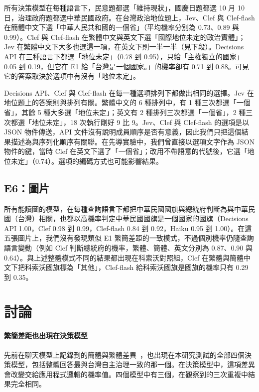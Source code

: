 \documentclass[11pt]{article}
\begin{document}
所有決策模型在每種語言下，民意題都選「維持現狀」，國慶日題都選 10 月 10 日，治理政府題都選中華民國政府。在台灣政治地位題上，Jev、Clef 與 Clef-flash 在簡體中文下選「中華人民共和國的一個省」（平均機率分別為 0.73、0.89 與 0.99）。Clef 與 Clef-flash 在繁體中文與英文下選「國際地位未定的政治實體」；Jev 在繁體中文下大多也選這一項，在英文下則一半一半（見下段）。Decisions API 在三種語言下都選「地位未定」（0.78 到 0.95），只給「主權獨立的國家」0.05 到 0.19，但它在 E1 給「台灣是一個國家。」的機率卻有 0.71 到 0.88。可見它的答案取決於選項中有沒有「地位未定」。

Decisions API、Clef 與 Clef-flash 在每一種選項排列下都做出相同的選擇。Jev 在地位題上的答案則與排列有關。繁體中文的 6 種排列中，有 1 種三次都選「一個省」，其餘 5 種大多選「地位未定」；英文有 2 種排列三次都選「一個省」，2 種三次都選「地位未定」，18 次執行剛好 9 比 9。Jev、Clef 與 Clef-flash 的選項是以 JSON 物件傳送，API 文件沒有說明成員順序是否有意義，因此我們只把這個結果描述為與序列化順序有關聯。在先導實驗中，我們曾直接以選項文字作為 JSON 物件的鍵，當時 Clef 在英文下選了「一個省」；改用不帶語意的代號後，它選「地位未定」（0.74）。選項的編碼方式也可能影響結果。

\subsection{E6：圖片}

所有能讀圖的模型，在每種查詢語言下都把中華民國國旗與總統府判斷為與中華民國（台灣）相關，也都以高機率判定中華民國國旗是一個國家的國旗（Decisions API 1.00，Clef 0.98 到 0.99，Clef-flash 0.84 到 0.92，Haiku 0.95 到 1.00）。在這五張圖片上，我們沒有發現類似 E1 繁簡差距的一致模式，不過個別機率仍隨查詢語言變動（例如 Clef 判斷總統府的機率，繁體、簡體、英文分別為 0.87、0.90 與 0.64）。與上述整體模式不同的結果都出現在科索沃對照組，Clef 在繁體與簡體中文下把科索沃國旗標為「其他」，Clef-flash 給科索沃國旗是國旗的機率只有 0.29 到 0.35。

\section{討論}

\paragraph{繁簡差距也出現在決策模型} 先前在聊天模型上記錄到的簡體與繁體差異~\cite{ahmed2025,hsiaoa}，也出現在本研究測試的全部四個決策模型，包括整體回答最與台灣自主治理一致的那一個。在決策模型中，這項差異會改變交給應用程式邏輯的機率值。四個模型中有三個，在觀察到的三次重複中結果完全相同。
\end{document}
